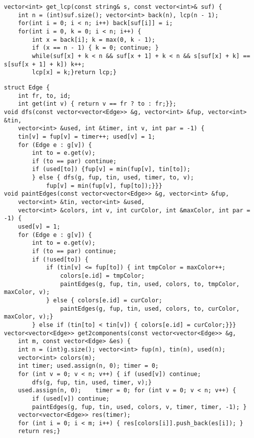 \documentclass[12pt]{article}
\begin{document}
\begin{verbatim}
vector<int> get_lcp(const string& s, const vector<int>& suf) {
    int n = (int)suf.size(); vector<int> back(n), lcp(n - 1);
    for(int i = 0; i < n; i++) back[suf[i]] = i;
    for(int i = 0, k = 0; i < n; i++) {
        int x = back[i]; k = max(0, k - 1);
        if (x == n - 1) { k = 0; continue; }
        while(suf[x] + k < n && suf[x + 1] + k < n && s[suf[x] + k] == s[suf[x + 1] + k]) k++;
        lcp[x] = k;}return lcp;}
\end{verbatim}

\begin{verbatim}
struct Edge {
    int fr, to, id;
    int get(int v) { return v == fr ? to : fr;}};
void dfs(const vector<vector<Edge>> &g, vector<int> &fup, vector<int> &tin, 
    vector<int> &used, int &timer, int v, int par = -1) {
    tin[v] = fup[v] = timer++; used[v] = 1;
    for (Edge e : g[v]) {
        int to = e.get(v);
        if (to == par) continue;
        if (used[to]) {fup[v] = min(fup[v], tin[to]);
        } else { dfs(g, fup, tin, used, timer, to, v);
            fup[v] = min(fup[v], fup[to]);}}}
void paintEdges(const vector<vector<Edge>> &g, vector<int> &fup, 
    vector<int> &tin, vector<int> &used,
    vector<int> &colors, int v, int curColor, int &maxColor, int par = -1) {
    used[v] = 1;
    for (Edge e : g[v]) {
        int to = e.get(v);
        if (to == par) continue;
        if (!used[to]) {
            if (tin[v] <= fup[to]) { int tmpColor = maxColor++;
                colors[e.id] = tmpColor;
                paintEdges(g, fup, tin, used, colors, to, tmpColor, maxColor, v);
            } else { colors[e.id] = curColor;
                paintEdges(g, fup, tin, used, colors, to, curColor, maxColor, v);}
        } else if (tin[to] < tin[v]) { colors[e.id] = curColor;}}}
vector<vector<Edge>> get2components(const vector<vector<Edge>> &g, 
    int m, const vector<Edge> &es) {
    int n = (int)g.size(); vector<int> fup(n), tin(n), used(n); 
    vector<int> colors(m);
    int timer; used.assign(n, 0); timer = 0;
    for (int v = 0; v < n; v++) { if (used[v]) continue;
        dfs(g, fup, tin, used, timer, v);}
    used.assign(n, 0);    timer = 0; for (int v = 0; v < n; v++) {
        if (used[v]) continue;
        paintEdges(g, fup, tin, used, colors, v, timer, timer, -1); }
    vector<vector<Edge>> res(timer);
    for (int i = 0; i < m; i++) { res[colors[i]].push_back(es[i]); }
    return res;}
\end{verbatim}
\end{document}
